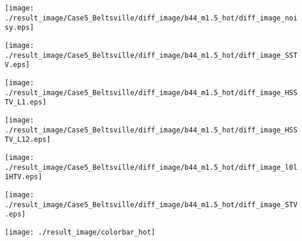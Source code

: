\begin{figure*}[t]
\begin{center}
		\begin{minipage}{0.125\hsize}
			\centerline{\hspace{\hsize}} %
		\end{minipage}
		\begin{minipage}{0.125\hsize}
			\centerline{\texttt{[image: ./result\_image/Case5\_Beltsville/diff\_image/b44\_m1.5\_hot/diff\_image\_noisy.eps]}} %
		\end{minipage}
		\begin{minipage}{0.125\hsize}
			\centerline{\texttt{[image: ./result\_image/Case5\_Beltsville/diff\_image/b44\_m1.5\_hot/diff\_image\_SSTV.eps]}} %
		\end{minipage}
		\begin{minipage}{0.125\hsize}
			\centerline{\texttt{[image: ./result\_image/Case5\_Beltsville/diff\_image/b44\_m1.5\_hot/diff\_image\_HSSTV\_L1.eps]}} %
		\end{minipage}
		\begin{minipage}{0.125\hsize}
			\centerline{\texttt{[image: ./result\_image/Case5\_Beltsville/diff\_image/b44\_m1.5\_hot/diff\_image\_HSSTV\_L12.eps]}} %
		\end{minipage}
		\begin{minipage}{0.125\hsize}
			\centerline{\texttt{[image: ./result\_image/Case5\_Beltsville/diff\_image/b44\_m1.5\_hot/diff\_image\_l0l1HTV.eps]}} %
		\end{minipage}
		\begin{minipage}{0.125\hsize}
			\centerline{\texttt{[image: ./result\_image/Case5\_Beltsville/diff\_image/b44\_m1.5\_hot/diff\_image\_STV.eps]}} %
		\end{minipage}
		\begin{minipage}{0.050\hsize}
			\centerline{\texttt{[image: ./result\_image/colorbar\_hot]}} %
		\end{minipage}
		
		\vspace{1mm}
		

\end{center}
\end{figure*}
